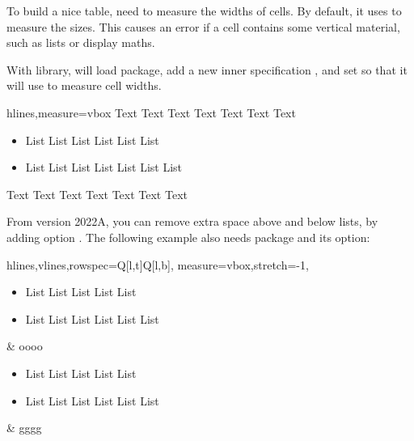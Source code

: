 \documentclass[oneside]{book}
\begin{document}
To build a nice table,  need to measure the widths of cells.
By default, it uses \CC{\hbox} to measure the sizes.
This causes an error if a cell contains some vertical material, such as lists or display maths.

With  library,  will load  package,
add a new inner specification , and set 
so that it will use \CC{\vbox} to measure cell widths.

\begin{demohigh}
\begin{tblr}{hlines,measure=vbox}
  Text Text Text Text Text Text Text
  \begin{itemize}
    \item List List List List List List
    \item List List List List List List List
  \end{itemize}
  Text Text Text Text Text Text Text \\
\end{tblr}
\end{demohigh}

From version 2022A, you can remove extra space above and below lists,
by adding option .
The following example also needs  package and its  option:

{\centering\begin{tblr}{
  hlines,vlines,rowspec={Q[l,t]Q[l,b]},
  measure=vbox,stretch=-1,
}
  \begin{itemize}[nosep]
    \item List List List List List
    \item List List List List List List
  \end{itemize} & oooo \\
  \begin{itemize}[nosep]
    \item List List List List List
    \item List List List List List List
  \end{itemize} & gggg \\
\end{tblr}\par}
\end{document}
